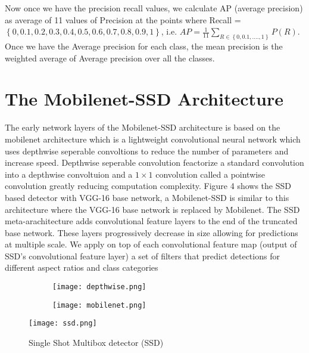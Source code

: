 \documentclass{article}
\begin{document}
Now once we have the precision recall values, we calculate AP (average precision) as average of 11 values of Precision at the points where Recall = $\left\{0, 0.1, 0.2, 0.3, 0.4, 0.5, 0.6, 0.7, 0.8, 0.9, 1\right\}$, i.e. $AP = \frac{1}{11} \sum_{R \in \left\{ 0, 0.1, ...., 1\right\}} P(R)$. Once we have the Average precision for each class, the mean precision is the weighted average of Average precision over all the classes.


\section{The Mobilenet-SSD Architecture}

The early network layers of the Mobilenet-SSD architecture is based on the mobilenet architecture \cite{howard2017mobilenets} which is a lightweight convolutional neural network which uses depthwise seperable convoltions to reduce the number of parameters and increase speed. Depthwise seperable convolution feactorize a standard convolution into a depthwise convoltuion and a $1 \times 1$ convolution called a pointwise convolution greatly reducing computation complexity. Figure 4 shows the SSD based detector with VGG-16 base network, a Mobilenet-SSD is similar to this architecture where the VGG-16 base network is replaced by Mobilenet.
 The SSD meta-arachitecture adds convolutional feature layers to the end of the truncated base network. These layers progressively decrease in size allowing for predictions at multiple scale.  We apply on top of each convolutional feature map (output of SSD's convolutional feature layer) a set of filters that predict detections for different aspect ratios
and class categories

\begin{figure}[H]
	\centering
	\begin{subfigure}[b]{0.475\textwidth}
		\texttt{[image: depthwise.png]}
	\end{subfigure}
	\begin{subfigure}[b]{0.475\textwidth}
		\texttt{[image: mobilenet.png]}
	\end{subfigure}
	\caption{}
\end{figure}

\begin{figure}[H]
	\centering
	\texttt{[image: ssd.png]}
	\caption{Single Shot Multibox detector (SSD)}
\end{figure}
\end{document}
